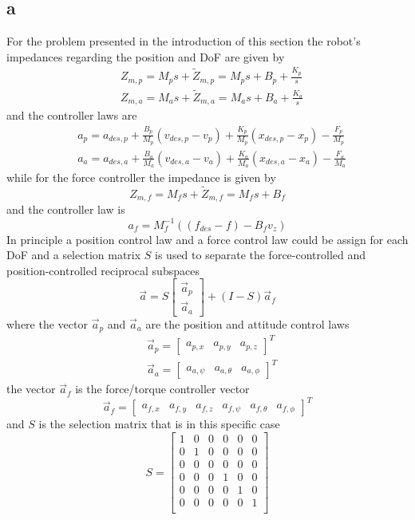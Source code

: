\subsection{a}
For the problem presented in the introduction of 
this section the robot's impedances regarding the position and DoF are given by
\[
\begin{split}
  &Z_{m,p} = M_p s + \tilde{Z}_{m,p} = M_p s + B_p + \frac{K_p}{s}\\
  &Z_{m,a} = M_a s + \tilde{Z}_{m,a} = M_a s + B_a + \frac{K_a}{s}
\end{split}
\]
and the controller laws are 
\[
\begin{split}
  &a_{p} = a_{des,p} + \frac{B_p}{M_p} (v_{des,p} - v_p) + \frac{K_p}{M_p} (x_{des,p} - x_p) - \frac{F_p}{M_p}\\
  &a_a = a_{des,a} + \frac{B_a}{M_a} (v_{des,a} - v_a) + \frac{K_a}{M_a} (x_{des,a} - x_a) - \frac{F_a}{M_a}
\end{split}
\]
while for the force controller the impedance is given by
\[
Z_{m,f} = M_f s + \tilde{Z}_{m,f} = M_f s + B_f
\]
and the controller law is
\[  
a_{f} = M_f^{-1}((f_{des} - f) - B_f v_z)
\]
In principle a position control law and a force control law could be assign for each DoF and a 
selection matrix $S$ is used to separate the force-controlled and position-controlled reciprocal subspaces
\[
\vec{a} = S 
\begin{bmatrix}
  \vec{a}_p \\
  \vec{a}_a
\end{bmatrix} + (I - S) \vec{a}_f
\]
where the vector $\vec{a}_p$ and $\vec{a}_a$ are the position and attitude control laws
\[
\begin{split}
  &\vec{a}_p = 
  \begin{bmatrix}
    a_{p,x} & a_{p,y} & a_{p,z}
  \end{bmatrix}^T\\
  &\vec{a}_a = 
  \begin{bmatrix}
    a_{a, \psi} & a_{a, \theta} & a_{a, \phi}
  \end{bmatrix}^T
\end{split}
\]
the vector $\vec{a}_f$ is the force/torque controller vector
\[
\vec{a}_f = 
\begin{bmatrix}
  a_{f,x} & a_{f,y} & a_{f,z} & a_{f, \psi} & a_{f, \theta} & a_{f, \phi}
\end{bmatrix}^T
\]
and $S$ is the selection matrix that is in this specific case
\[
S =
\begin {bmatrix}
  1 & 0 & 0 & 0 & 0 & 0\\
  0 & 1 & 0 & 0 & 0 & 0\\
  0 & 0 & 0 & 0 & 0 & 0\\
  0 & 0 & 0 & 1 & 0 & 0\\
  0 & 0 & 0 & 0 & 1 & 0\\
  0 & 0 & 0 & 0 & 0 & 1\\
\end {bmatrix}
\]

